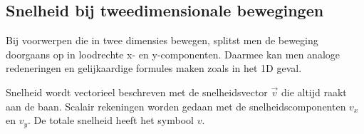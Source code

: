 \documentclass{ximera}
\begin{document}
\subsection*{Snelheid bij tweedimensionale bewegingen}

Bij voorwerpen die in twee dimensies bewegen, splitst men de beweging doorgaans op in loodrechte x- en y-componenten. Daarmee kan men analoge redeneringen en gelijkaardige formules maken zoals in het 1D geval.




Snelheid wordt vectorieel beschreven met de snelheidsvector \(\vec{v}\) die altijd raakt aan de baan. Scalair rekeningen worden gedaan met de snelheidscomponenten \(v_x\) en \(v_y\). De totale snelheid heeft het symbool \(v\).
\end{document}
